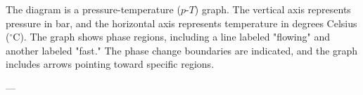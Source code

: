 The diagram is a pressure-temperature (\(p\)-\(T\)) graph. The vertical axis represents pressure in bar, and the horizontal axis represents temperature in degrees Celsius (\(^\circ\text{C}\)). The graph shows phase regions, including a line labeled "flowing" and another labeled "fast." The phase change boundaries are indicated, and the graph includes arrows pointing toward specific regions.

---